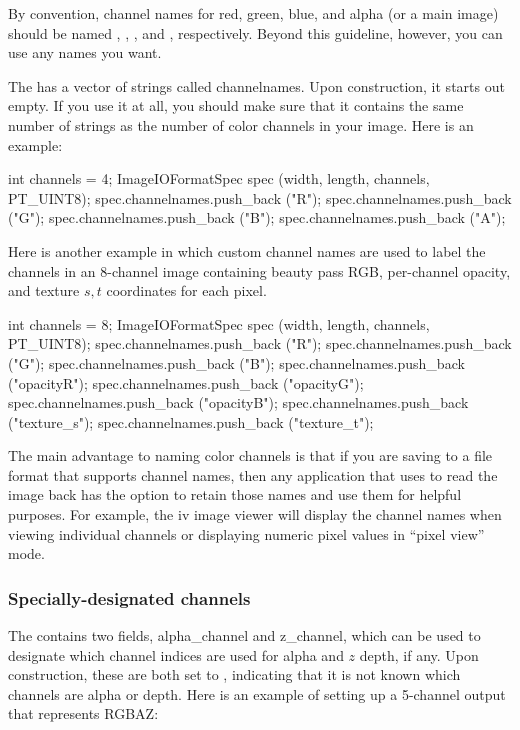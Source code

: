 By convention, channel names for red, green, blue, and alpha (or a main
image) should be named , , , and ,
respectively.  Beyond this guideline, however, you can use any names you
want.

The \ImageIOFormatSpec has a vector of strings called {\cf
  channelnames}.  Upon construction, it starts out empty.  If you use it
at all, you should make sure that it contains the same number of strings
as the number of color channels in your image.  Here is an example:

\begin{code}
        int channels = 4;
        ImageIOFormatSpec spec (width, length, channels, PT_UINT8);
        spec.channelnames.push_back ("R");
        spec.channelnames.push_back ("G");
        spec.channelnames.push_back ("B");
        spec.channelnames.push_back ("A");
\end{code}

Here is another example in which custom channel names are used to 
label the channels in an 8-channel image containing beauty pass
RGB, per-channel opacity, and texture $s,t$ coordinates for each pixel.

\begin{code}
        int channels = 8;
        ImageIOFormatSpec spec (width, length, channels, PT_UINT8);
        spec.channelnames.push_back ("R");
        spec.channelnames.push_back ("G");
        spec.channelnames.push_back ("B");
        spec.channelnames.push_back ("opacityR");
        spec.channelnames.push_back ("opacityG");
        spec.channelnames.push_back ("opacityB");
        spec.channelnames.push_back ("texture_s");
        spec.channelnames.push_back ("texture_t");
\end{code}

The main advantage to naming color channels is that if you are saving to
a file format that supports channel names, then any application that
uses \product to read the image back has the option to retain those
names and use them for helpful purposes.  For example, the {\cf iv}
image viewer will display the channel names when viewing individual
channels or displaying numeric pixel values in ``pixel view'' mode.


\subsubsection{Specially-designated channels}

The \ImageIOFormatSpec contains two fields, {\cf alpha_channel} and {\cf
  z_channel}, which can be used to designate which channel indices are
used for alpha and $z$ depth, if any.  Upon construction, these are both
set to {}, indicating that it is not known which channels 
are alpha or depth.  Here is an example of setting up a 5-channel output
that represents RGBAZ:

